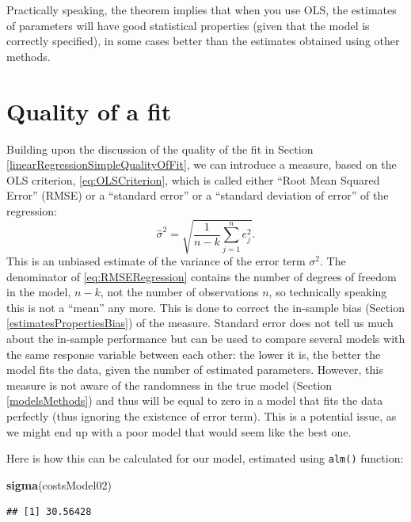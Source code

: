 \documentclass[
]{book}
\newenvironment{Shaded}{\begin{snugshade}}{\end{snugshade}}
\newcommand{\FunctionTok}[1]{\textcolor[rgb]{0.13,0.29,0.53}{\textbf{#1}}}
\newcommand{\NormalTok}[1]{#1}
\theoremstyle{definition}
\theoremstyle{definition}
\theoremstyle{definition}
\theoremstyle{definition}
\theoremstyle{remark}
\begin{document}
Practically speaking, the theorem implies that when you use OLS, the estimates of parameters will have good statistical properties (given that the model is correctly specified), in some cases better than the estimates obtained using other methods.

\section{Quality of a fit}\label{linearRegressionMultipleQualityOfFit}

Building upon the discussion of the quality of the fit in Section \ref{linearRegressionSimpleQualityOfFit}, we can introduce a measure, based on the OLS criterion, \eqref{eq:OLSCriterion}, which is called either ``Root Mean Squared Error'' (RMSE) or a ``standard error'' or a ``standard deviation of error'' of the regression:
\begin{equation}
    \hat{\sigma}^2 = \sqrt{\frac{1}{n-k} \sum_{j=1}^n e_j^2 }.
    \label{eq:RMSERegression}
\end{equation}
This is an unbiased estimate of the variance of the error term \(\sigma^2\). The denominator of \eqref{eq:RMSERegression} contains the number of degrees of freedom in the model, \(n-k\), not the number of observations \(n\), so technically speaking this is not a ``mean'' any more. This is done to correct the in-sample bias (Section \ref{estimatesPropertiesBias}) of the measure. Standard error does not tell us much about the in-sample performance but can be used to compare several models with the same response variable between each other: the lower it is, the better the model fits the data, given the number of estimated parameters. However, this measure is not aware of the randomness in the true model (Section \ref{modelsMethods}) and thus will be equal to zero in a model that fits the data perfectly (thus ignoring the existence of error term). This is a potential issue, as we might end up with a poor model that would seem like the best one.

Here is how this can be calculated for our model, estimated using \texttt{alm()} function:

\begin{Shaded}
\begin{Highlighting}[]
\FunctionTok{sigma}\NormalTok{(costsModel02)}
\end{Highlighting}
\end{Shaded}

\begin{verbatim}
## [1] 30.56428
\end{verbatim}
\end{document}
